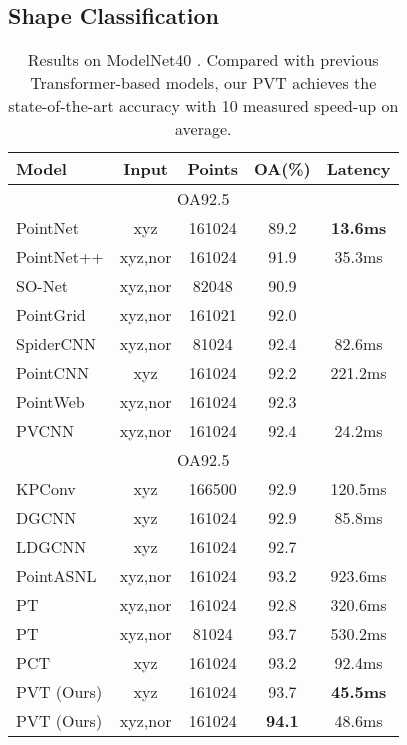 \documentclass[10pt,twocolumn,letterpaper]{article}
\begin{document}
\subsection{Shape Classification}
\begin{table}  
\centering
\begin{center} 
\begin{tabular}{|l|cccc|}   
\hline  
Model & Input & Points & OA(\%) & Latency\\ 
\hline
\multicolumn{5}{|c|}{OA92.5} \\
\hline
PointNet  & xyz & 161024 &  89.2  & \textbf{13.6ms}\\ 
PointNet++  \cite{qi2017pointnet++} & xyz,nor & 161024 &  91.9  & 35.3ms\\  
SO-Net \cite{2018SO}  & xyz,nor & 82048 & 90.9   & \\
PointGrid \cite{2018PointGrid}  & xyz,nor & 161021 & 92.0   & \\
SpiderCNN \cite{2018SpiderCNN}  & xyz,nor & 81024 & 92.4   &82.6ms \\
PointCNN \cite{2018PointCNN} & xyz & 161024 & 92.2  & 221.2ms\\  
PointWeb \cite{zhao2019pointweb}  & xyz,nor & 161024 & 92.3  & \\  
PVCNN \cite{2019Point} & xyz,nor & 161024  & 92.4 & 24.2ms\\
\hline
\multicolumn{5}{|c|}{OA92.5} \\
\hline
KPConv \cite{2019KPConv}  & xyz &166500 & 92.9   &120.5ms \\ 
DGCNN \cite{2018Dynamic}  & xyz & 161024 & 92.9  &  85.8ms\\
LDGCNN \cite{2019Linked}  & xyz & 161024 & 92.7  & \\
PointASNL \cite{2020PointASNL} & xyz,nor & 161024 & 93.2  & 923.6ms\\
PT \cite{Nico}& xyz,nor & 161024 & 92.8 & 320.6ms\\
PT \cite{zhao2020point} & xyz,nor  & 81024 & 93.7  & 530.2ms \\
PCT \cite{guo2020pct}  & xyz  & 161024 & 93.2 & 92.4ms\\
PVT (Ours) & xyz & 161024  & 93.7 & \textbf{45.5ms}\\
PVT (Ours) & xyz,nor & 161024  & \textbf{94.1} & 48.6ms\\
\hline

\end{tabular}  
\end{center}  
\caption{Results on ModelNet40 \cite{20153D}. Compared with previous Transformer-based models, our PVT achieves the state-of-the-art accuracy with 10 measured speed-up on average.} 
\label{cla}
\end{table} 
\end{document}

